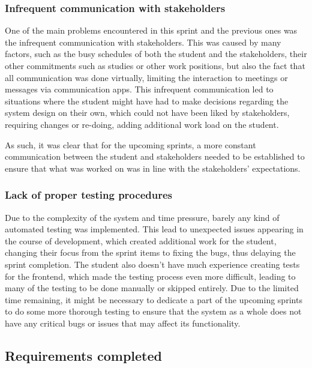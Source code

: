 \subsubsection{Infrequent communication with stakeholders}

One of the main problems encountered in this sprint and the previous ones was the infrequent communication with stakeholders. This was caused by many factors, such as the busy schedules of both the student and the stakeholders, their other commitments such as studies or other work positions, but also the fact that all communication was done virtually, limiting the interaction to meetings or messages via communication apps. This infrequent communication led to situations where the student might have had to make decisions regarding the system design on their own, which could not have been liked by stakeholders, requiring changes or re-doing, adding additional work load on the student. 

As such, it was clear that for the upcoming sprints, a more constant communication between the student and stakeholders needed to be established to ensure that what was worked on was in line with the stakeholders' expectations.

\subsubsection{Lack of proper testing procedures}

Due to the complexity of the system and time pressure, barely any kind of automated testing was implemented. This lead to unexpected issues appearing in the course of development, which created additional work for the student, changing their focus from the sprint items to fixing the bugs, thus delaying the sprint completion. The student also doesn't have much experience creating tests for the frontend, which made the testing process even more difficult, leading to many of the testing to be done manually or skipped entirely. Due to the limited time remaining, it might be necessary to dedicate a part of the upcoming sprints to do some more thorough testing to ensure that the system as a whole does not have any critical bugs or issues that may affect its functionality.

\subsection{Requirements completed}

